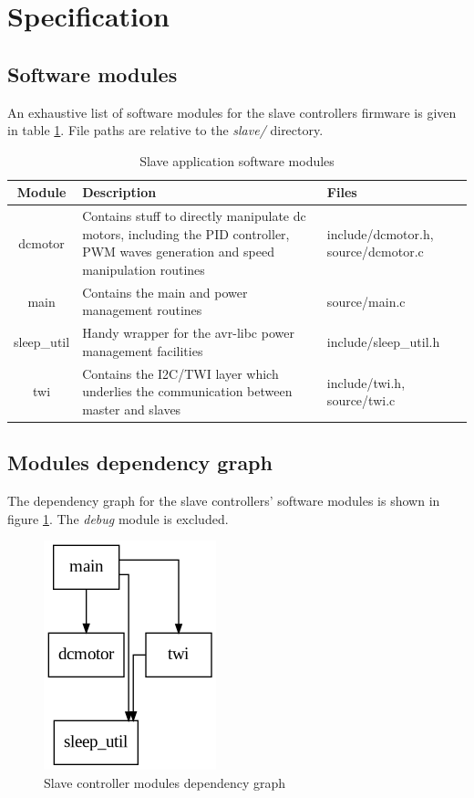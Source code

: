 \documentclass[binding=0.6cm,Lau]{sapthesis}
\makeatletter
\def\maxwidth#1{\ifdim\Gin@nat@width>#1 #1\else\Gin@nat@width\fi}
\makeatother
\begin{document}
\section{Specification}

\subsection{Software modules}
An exhaustive list of software modules for the slave controllers firmware is
given in table \ref{tab:slave-spec-modules}. File paths are relative to the
\emph{slave/} directory.

\begin{table}[bh]
  \begin{tabularx}{\textwidth}{c X X}
    \toprule
    Module & Description & Files \\
    \midrule
    dcmotor &
      Contains stuff to directly manipulate dc motors, including the PID controller, PWM waves generation and speed manipulation routines &
      include/dcmotor.h, source/dcmotor.c \\
    main &
      Contains the main and power management routines &
      source/main.c \\
    sleep\_util &
      Handy wrapper for the avr-libc power management facilities &
      include/sleep\_util.h \\
    twi &
      Contains the I2C/TWI layer which underlies the communication between master and slaves &
      include/twi.h, source/twi.c \\
    \bottomrule
  \end{tabularx}
  \caption{Slave application software modules}
  \label{tab:slave-spec-modules}
\end{table}


\subsection{Modules dependency graph}
The dependency graph for the slave controllers' software modules is shown in
figure \ref{img:slave-deps-graph}. The \emph{debug} module is excluded.
\begin{figure}[hbp]
\begin{centering}
  \includegraphics[width=\maxwidth{\textwidth}]{img/slave-deps}
  \caption{Slave controller modules dependency graph}
  \label{img:slave-deps-graph}
\end{centering}
\end{figure}
\end{document}

